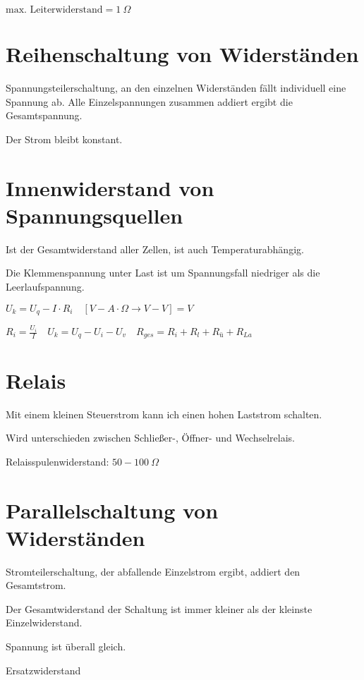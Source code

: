 $\boxed{\text{max. Leiterwiderstand} = 1~\Omega}$

\section{Reihenschaltung von
Widerständen}\label{reihenschaltung-von-widerstaenden}

Spannungsteilerschaltung, an den einzelnen Widerständen fällt
individuell eine Spannung ab. Alle Einzelspannungen zusammen addiert
ergibt die Gesamtspannung.

Der Strom bleibt konstant.

\section{Innenwiderstand von
Spannungsquellen}\label{innenwiderstand-von-spannungsquellen}

Ist der Gesamtwiderstand aller Zellen, ist auch Temperaturabhängig.

Die Klemmenspannung unter Last ist um Spannungsfall niedriger als die
Leerlaufspannung.

$\boxed{U_k = U_q - I \cdot R_i} \quad [V - A \cdot \Omega \to V - V] = V$

$\boxed{R_i = \frac{U_i}{I}} \quad \boxed{U_k = U_q - U_i - U_v} \quad \boxed{R_{ges} = R_i + R_l + R_\text{ü} + R_{La}}$

\section{Relais}\label{relais}

Mit einem kleinen Steuerstrom kann ich einen hohen Laststrom schalten.

Wird unterschieden zwischen Schließer-, Öffner- und Wechselrelais.

Relaisspulenwiderstand: $50 - 100~\Omega$

\section{Parallelschaltung von
Widerständen}\label{parallelschaltung-von-widerstaenden}

Stromteilerschaltung, der abfallende Einzelstrom ergibt, addiert den
Gesamtstrom.

Der Gesamtwiderstand der Schaltung ist immer kleiner als der kleinste
Einzelwiderstand.

Spannung ist überall gleich.

Ersatzwiderstand


